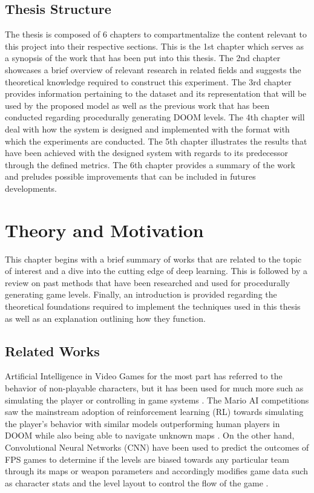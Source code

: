 \documentclass{Configuration_Files/PoliMi3i_thesis}
\begin{document}
\section{Thesis Structure}
The thesis is composed of 6 chapters to compartmentalize the content relevant to this 
project into their respective sections. This is the 1st chapter which serves as a synopsis 
of the work that has been put into this thesis. The 2nd chapter showcases a brief 
overview of relevant research in related fields and suggests the theoretical knowledge 
required to construct this experiment. The 3rd chapter provides information pertaining 
to the dataset and its representation that will be used by the proposed model as well 
as the previous work that has been conducted regarding procedurally generating  
DOOM levels. The 4th chapter will deal with how the system is designed and implemented
with the format with which the experiments are conducted. The 5th chapter illustrates 
the results that have been achieved with the designed system with regards to its 
predecessor through the defined metrics. The 6th chapter provides a summary of the 
work and preludes possible improvements that can be included in futures 
developments.

\chapter{Theory and Motivation}
\label{ch:theory and motivation}%
This chapter begins with a brief summary of works that are related to the topic of interest 
and a dive into the cutting edge of deep learning. This is followed by a review on past methods 
that have been researched and used for procedurally
generating game levels. Finally, an introduction is provided regarding the theoretical 
foundations required to implement the techniques used in this thesis as well as an explanation 
outlining how they function.

\section{Related Works}
Artificial Intelligence in Video Games for the most part has referred to the behavior 
of non-playable characters, but it has been used for much more such 
as simulating the player or controlling in game systems \cite{JiL20,DaK21}. The 
Mario AI competitions \cite{KaS12} saw the mainstream adoption of reinforcement learning 
(RL) towards simulating the player's behavior with similar models outperforming 
human players in DOOM while also being able to navigate unknown maps \cite{GuL16}. 
On the other hand, Convolutional Neural Networks (CNN) have been used to predict the 
outcomes of FPS games to determine if the levels are biased towards any particular team through its maps 
or weapon parameters and accordingly modifies game data such as character stats and the level layout 
to control the flow of the game \cite{DaK21}.
\end{document}
